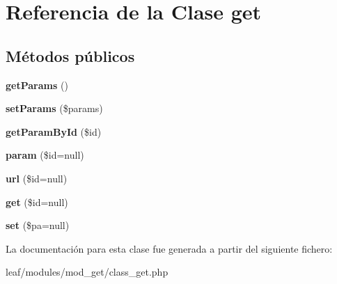 \hypertarget{classget}{\section{Referencia de la Clase get}
\label{classget}
}
\subsection*{Métodos públicos}
\begin{DoxyCompactItemize}
\item 
\hypertarget{classget_ae32cd7c32721b02d676bb63b4b1366db}{{\bfseries get\-Params} ()}\label{classget_ae32cd7c32721b02d676bb63b4b1366db}

\item 
\hypertarget{classget_a99452a2ee9dfa3243a205c61d8f728cc}{{\bfseries set\-Params} (\$params)}\label{classget_a99452a2ee9dfa3243a205c61d8f728cc}

\item 
\hypertarget{classget_a5be10227323f78fb348e88459777bcb0}{{\bfseries get\-Param\-By\-Id} (\$id)}\label{classget_a5be10227323f78fb348e88459777bcb0}

\item 
\hypertarget{classget_ae9982f3498cde486a2f9542693e5898b}{{\bfseries param} (\$id=null)}\label{classget_ae9982f3498cde486a2f9542693e5898b}

\item 
\hypertarget{classget_adc9e1f04da050dcdc6bc9e4ca7e8aa6b}{{\bfseries url} (\$id=null)}\label{classget_adc9e1f04da050dcdc6bc9e4ca7e8aa6b}

\item 
\hypertarget{classget_aa2349c4188f0c5af9109ec85e7991538}{{\bfseries get} (\$id=null)}\label{classget_aa2349c4188f0c5af9109ec85e7991538}

\item 
\hypertarget{classget_a5aadd030742b383ddcdf4374f4dd3dd2}{{\bfseries set} (\$pa=null)}\label{classget_a5aadd030742b383ddcdf4374f4dd3dd2}

\end{DoxyCompactItemize}


La documentación para esta clase fue generada a partir del siguiente fichero\-:\begin{DoxyCompactItemize}
\item 
leaf/modules/mod\-\_\-get/class\-\_\-get.\-php\end{DoxyCompactItemize}
